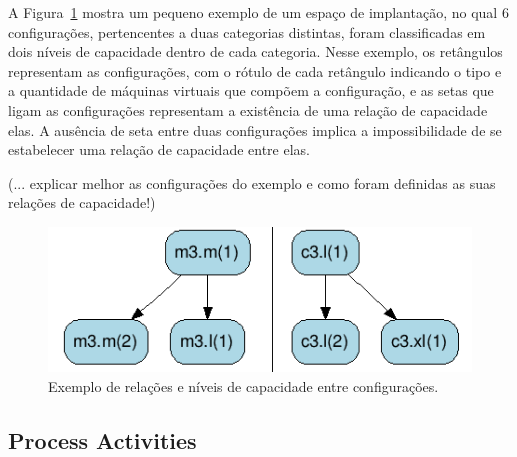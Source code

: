 \documentclass[10pt,conference,compsocconf]{IEEEtran}
\begin{document}


A Figura~\ref{fig_niveis_capacidade} mostra um pequeno exemplo de um espaço de implantação, no qual 6 configurações,
pertencentes a duas categorias distintas, foram classificadas em dois níveis de capacidade dentro de cada categoria. Nesse exemplo, os retângulos representam as configurações, com o rótulo de cada retângulo indicando o tipo e a quantidade de máquinas virtuais que compõem a configuração, e as setas que ligam as configurações representam a existência de uma relação de capacidade elas. A ausência de seta entre duas configurações implica a impossibilidade de se estabelecer uma relação de capacidade entre elas. 

(... explicar melhor as configurações do exemplo e como foram definidas as suas relações de capacidade!)

\begin{figure}[t]
  \begin{center}
    \includegraphics[scale=.5]{img/exemplo-niveis-capacidade}
  \end{center}
  \caption{\label{fig_niveis_capacidade}Exemplo de relações e níveis de capacidade entre configurações.}
\end{figure}



\subsection{Process Activities}
\end{document}
